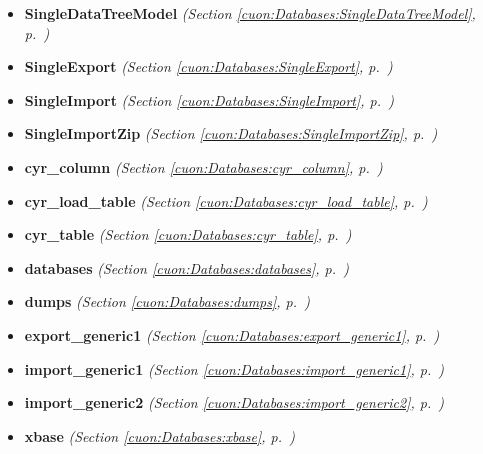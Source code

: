 \begin{itemize}
\begin{itemize}
    \item \textbf{SingleDataTreeModel}
  \textit{(Section \ref{cuon:Databases:SingleDataTreeModel}, p.~\pageref{cuon:Databases:SingleDataTreeModel})}

    \item \textbf{SingleExport}
  \textit{(Section \ref{cuon:Databases:SingleExport}, p.~\pageref{cuon:Databases:SingleExport})}

    \item \textbf{SingleImport}
  \textit{(Section \ref{cuon:Databases:SingleImport}, p.~\pageref{cuon:Databases:SingleImport})}

    \item \textbf{SingleImportZip}
  \textit{(Section \ref{cuon:Databases:SingleImportZip}, p.~\pageref{cuon:Databases:SingleImportZip})}

    \item \textbf{cyr\_column}
  \textit{(Section \ref{cuon:Databases:cyr_column}, p.~\pageref{cuon:Databases:cyr_column})}

    \item \textbf{cyr\_load\_table}
  \textit{(Section \ref{cuon:Databases:cyr_load_table}, p.~\pageref{cuon:Databases:cyr_load_table})}

    \item \textbf{cyr\_table}
  \textit{(Section \ref{cuon:Databases:cyr_table}, p.~\pageref{cuon:Databases:cyr_table})}

    \item \textbf{databases}
  \textit{(Section \ref{cuon:Databases:databases}, p.~\pageref{cuon:Databases:databases})}

    \item \textbf{dumps}
  \textit{(Section \ref{cuon:Databases:dumps}, p.~\pageref{cuon:Databases:dumps})}

    \item \textbf{export\_generic1}
  \textit{(Section \ref{cuon:Databases:export_generic1}, p.~\pageref{cuon:Databases:export_generic1})}

    \item \textbf{import\_generic1}
  \textit{(Section \ref{cuon:Databases:import_generic1}, p.~\pageref{cuon:Databases:import_generic1})}

    \item \textbf{import\_generic2}
  \textit{(Section \ref{cuon:Databases:import_generic2}, p.~\pageref{cuon:Databases:import_generic2})}

    \item \textbf{xbase}
  \textit{(Section \ref{cuon:Databases:xbase}, p.~\pageref{cuon:Databases:xbase})}


\end{itemize}
\end{itemize}
